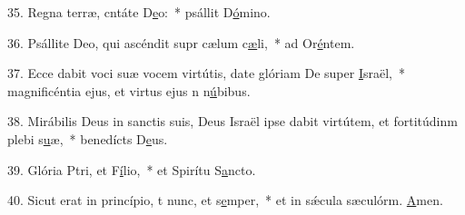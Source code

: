 35. Regna terræ, cntáte D\uline{e}o:~* psállit D\uline{ó}mino.\par 
36. Psállite Deo, qui ascéndit supr cælum c\uline{æ}li,~* ad Or\uline{é}ntem.\par 
37. Ecce dabit voci suæ vocem virtútis, date glóriam De super \uline{I}sraël,~* magnificéntia ejus, et virtus ejus n n\uline{ú}bibus.\par 
38. Mirábilis Deus in sanctis suis, Deus Israël ipse dabit virtútem, et fortitúdinm plebi s\uline{u}æ,~* benedícts D\uline{e}us.\par 
39. Glória Ptri, et F\uline{í}lio,~* et Spirítu S\uline{a}ncto.\par 
40. Sicut erat in princípio, t nunc, et s\uline{e}mper,~* et in sǽcula sæculórm. \uline{A}men.\par 
